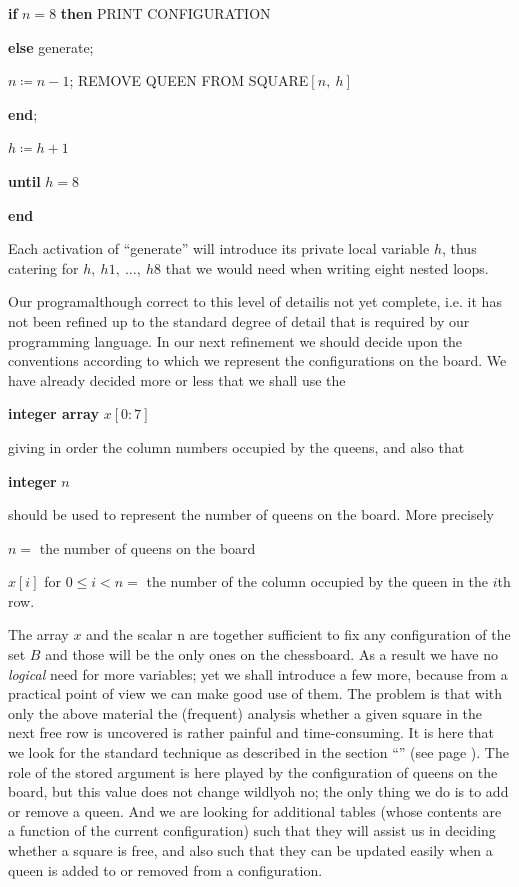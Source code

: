 \quad \quad \textbf{if} $n = 8$ \textbf{then} PRINT CONFIGURATION

\quad \quad \textbf{else} generate;

\quad \quad $n \coloneq n - 1$; REMOVE QUEEN FROM SQUARE$[n,\ h]$

\quad \textbf{end};

\quad $h \coloneq h + 1$

\quad \textbf{until} $h = 8$

\textbf{end}

Each activation of ``generate'' will introduce its private local variable $h$, thus catering for $h,\ h1,\ \dots,\ h8$ that we would need when writing eight nested loops.

Our program\textemdash{}although correct to this level of detail\textemdash{}is not yet complete, i.e. it has not been refined up to the standard degree of detail that is required by our programming language. In our next refinement we should decide upon the conventions according to which we represent the configurations on the board. We have already decided more or less that we shall use the

\quad \textbf{integer array} $x[0:7]$

\noindent
giving in order the column numbers occupied by the queens, and also that

\quad \textbf{integer} $n$

\noindent
should be used to represent the number of queens on the board. More precisely

$n =$ the number of queens on the board

\parindent $x[i]$ for $0 \leqslant i < n =$ the number of the column occupied by the queen in the $i$th row.

The array $x$ and the scalar n are together sufficient to fix any configuration of the set $B$ and those will be the only ones on the chessboard. As a result we have no \textit{logical} need for more variables; yet we shall introduce a few more, because from a practical point of view we can make good use of them. The problem is that with only the above material the (frequent) analysis whether a given square in the next free row is uncovered is rather painful and time-consuming. It is here that we look for the standard technique as described in the section ``'' (see page \pageref{sec:trading-storage-for-computation-speed}). The role of the stored argument is here played by the configuration of queens on the board, but this value does not change wildly\textemdash{}oh no; the only thing we do is to add or remove a queen. And we are looking for additional tables (whose contents are a function of the current configuration) such that they will assist us in deciding whether a square is free, and also such that they can be updated easily when a queen is added to or removed from a configuration.

